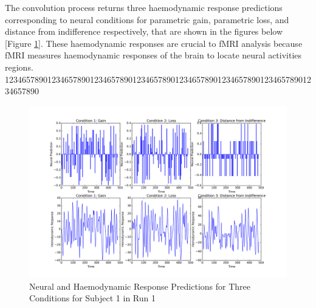 \par \indent The convolution process returns three haemodynamic response 
predictions corresponding to neural conditions for parametric gain, parametric 
loss, and distance from indifference respectively, that are shown in the 
figures below [Figure \ref{fig:convolution}]. These haemodynamic responses are 
crucial to fMRI analysis because fMRI measures haemodynamic responses of the 
brain to locate neural activities regions. 
12346578901234657890123465789012346578901234657890123465789012346578901234657890
\begin{figure}[h!]
\centering
\includegraphics[width=120mm]{images/convolution3cond.png}
\caption{Neural and Haemodynamic Response Predictions for Three Conditions for
         Subject 1 in Run 1}
\label{fig:convolution}
\end{figure}
